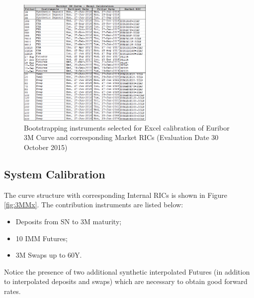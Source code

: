 \begin{figure}
\centering
\includegraphics[width=0.58\textwidth]{images/3MExcel.png}
\caption{Bootstrapping instruments selected for Excel calibration of Euribor 3M Curve and corresponding Market RICs (Evaluation Date 30 October 2015)}
\label{fig:3MExcel}
\end{figure}

\subsection{System Calibration}

The curve structure with corresponding Internal RICs is shown in Figure \ref{fig:3MMx}. The contribution instruments are listed below:
\begin{itemize}
\item Deposits from SN to 3M maturity; 
\item 10 IMM Futures;
\item 3M Swaps up to 60Y.
\end{itemize}
Notice the presence of two additional synthetic interpolated Futures (in addition to interpolated deposits and swaps) which are necessary to obtain good forward rates. 

